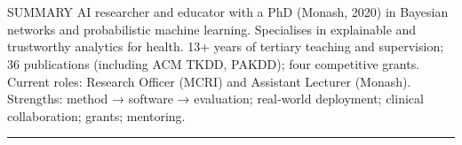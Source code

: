 \documentclass{my_cv}
\begin{document}


\section{\faFileText}{SUMMARY}
AI researcher and educator with a PhD (Monash, 2020) in Bayesian networks and probabilistic machine learning. Specialises in explainable and trustworthy analytics for health. 13+ years of tertiary teaching and supervision; 36 publications (including ACM TKDD, PAKDD); four competitive grants. Current roles: Research Officer (MCRI) and Assistant Lecturer (Monash). Strengths: method → software → evaluation; real‑world deployment; clinical collaboration; grants; mentoring.









% 






% 

% 




















\noindent\rule{18.75cm}{0.6pt}
\vspace{20pt}


\end{document}

